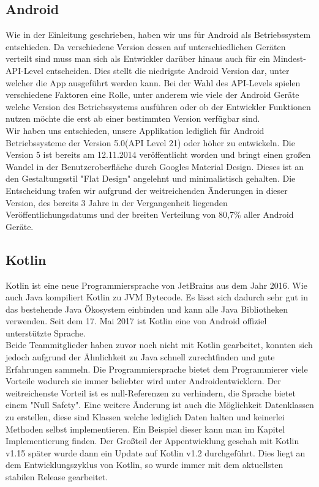 \subsection{Android}
Wie in der Einleitung geschrieben, haben wir uns für Android als Betriebssystem entschieden. Da verschiedene Version dessen auf unterschiedlichen Geräten verteilt sind
muss man sich als Entwickler darüber hinaus auch für ein Mindest-API-Level entscheiden. Dies stellt die niedrigste Android Version dar, unter welcher die App ausgeführt werden kann.
Bei der Wahl des API-Levels spielen verschiedene Faktoren eine Rolle, unter anderem wie viele der Android Geräte welche Version des Betriebssystems ausführen oder ob der Entwickler
Funktionen nutzen möchte die erst ab einer bestimmten Version verfügbar sind.\\
Wir haben uns entschieden, unsere Applikation lediglich für Android Betriebssysteme der Version 5.0(API Level 21) oder höher zu entwickeln.
Die Version 5 ist bereits am 12.11.2014 veröffentlicht worden und bringt einen großen Wandel in der Benutzeroberfläche durch Googles Material Design.
Dieses ist an den Gestaltungsstil "Flat Design" angelehnt und minimalistisch gehalten. Die Entscheidung trafen wir aufgrund der weitreichenden 
Änderungen in dieser Version, des bereits 3 Jahre in der Vergangenheit liegenden Veröffentlichungsdatums und der breiten Verteilung von 80,7\% aller Android Geräte.

\subsection{Kotlin}

Kotlin ist eine neue Programmiersprache von JetBrains aus dem Jahr 2016. Wie auch Java kompiliert Kotlin zu JVM Bytecode. Es lässt sich dadurch sehr gut in das bestehende Java Ökosystem einbinden und kann alle Java Bibliotheken verwenden. Seit dem 17. Mai 2017 ist Kotlin eine von Android offiziel unterstützte Sprache.\\
Beide Teammitglieder haben zuvor noch nicht mit Kotlin gearbeitet, konnten sich jedoch aufgrund der Ähnlichkeit zu Java schnell zurechtfinden und gute Erfahrungen sammeln. Die Programmiersprache bietet dem Programmierer viele Vorteile wodurch sie immer beliebter wird unter Androidentwicklern. Der weitreichenste Vorteil ist es  null-Referenzen zu verhindern, die Sprache bietet einem "Null Safety". Eine weitere Änderung ist auch die Möglichkeit Datenklassen zu erstellen, diese sind Klassen welche lediglich Daten halten und keinerlei Methoden selbst implementieren. Ein Beispiel dieser kann man im Kapitel Implementierung finden. Der Großteil der Appentwicklung geschah mit Kotlin v1.15 später wurde dann ein Update auf Kotlin v1.2 durchgeführt. Dies liegt an dem Entwicklungszyklus von Kotlin, so wurde immer mit dem aktuellsten stabilen Release gearbeitet.

